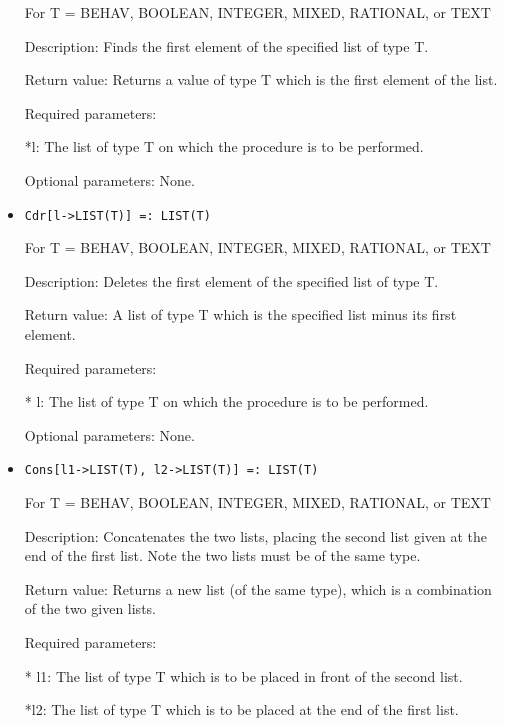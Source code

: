 \begin{itemize}
For T = BEHAV, BOOLEAN, INTEGER, MIXED, RATIONAL, or TEXT 

\bd
\item
[Description:] Finds the first element of the specified list of type T.
\item
[Return value:] Returns a value of type T which is the first element
of the list.
\item 
[Required parameters:]\hfil\null
	
\bd
\item
[*l:] The list of type T on which the procedure is to be performed.
\ed

\item
[Optional parameters:] None.
\ed

\item

\begin{verbatim}
Cdr[l->LIST(T)] =: LIST(T)
\end{verbatim}

For T = BEHAV, BOOLEAN, INTEGER, MIXED, RATIONAL, or TEXT

\bd
\item
[Description:] Deletes the first element of the specified list of type T.
\item 
[Return value:] A list of type T which is the specified list minus its
first element.
\item   
[Required parameters:]\hfil\null

\bd
\item
[* l:] The list of type T on which the procedure is to be performed.
\ed
\item
[Optional parameters:] None.
\ed

\item

\begin{verbatim}
Cons[l1->LIST(T), l2->LIST(T)] =: LIST(T)
\end{verbatim}

For T = BEHAV, BOOLEAN, INTEGER, MIXED, RATIONAL, or TEXT

\bd
\item
[Description:] Concatenates the two lists, placing the second list given
at the end of the first list.  Note the two lists must be of the same type.
\item 
[Return value:] Returns a new list (of the same type), which is a 
combination of the two given lists.
\item
[Required parameters:]\hfil\null

\bd
\item
[* l1:] The list of type T which is to be placed in front of the second list.
\item 
[*l2:] The list of type T which is to be placed at the end of the first list.
\ed


\end{itemize}
